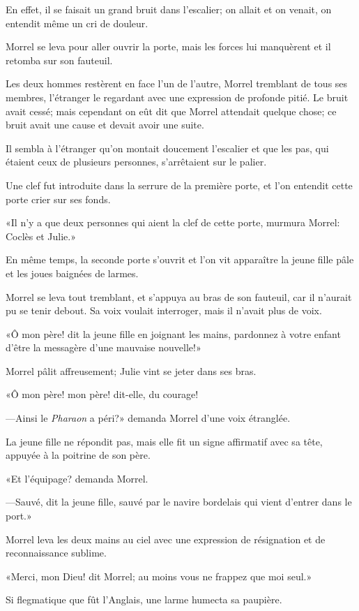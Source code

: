 En effet, il se faisait un grand bruit dans l'escalier; on allait et on venait, on entendit même un cri de douleur.

Morrel se leva pour aller ouvrir la porte, mais les forces lui manquèrent et il retomba sur son fauteuil.

Les deux hommes restèrent en face l'un de l'autre, Morrel tremblant de tous ses membres, l'étranger le regardant avec une expression de profonde pitié. Le bruit avait cessé; mais cependant on eût dit que Morrel attendait quelque chose; ce bruit avait une cause et devait avoir une suite.

Il sembla à l'étranger qu'on montait doucement l'escalier et que les pas, qui étaient ceux de plusieurs personnes, s'arrêtaient sur le palier.

Une clef fut introduite dans la serrure de la première porte, et l'on entendit cette porte crier sur ses fonds.

«Il n'y a que deux personnes qui aient la clef de cette porte, murmura Morrel: Coclès et Julie.»

En même temps, la seconde porte s'ouvrit et l'on vit apparaître la jeune fille pâle et les joues baignées de larmes.

Morrel se leva tout tremblant, et s'appuya au bras de son fauteuil, car il n'aurait pu se tenir debout. Sa voix voulait interroger, mais il n'avait plus de voix.

«Ô mon père! dit la jeune fille en joignant les mains, pardonnez à votre enfant d'être la messagère d'une mauvaise nouvelle!»

Morrel pâlit affreusement; Julie vint se jeter dans ses bras.

«Ô mon père! mon père! dit-elle, du courage!

—Ainsi le \textit{Pharaon} a péri?» demanda Morrel d'une voix étranglée.

La jeune fille ne répondit pas, mais elle fit un signe affirmatif avec sa tête, appuyée à la poitrine de son père.

«Et l'équipage? demanda Morrel.

—Sauvé, dit la jeune fille, sauvé par le navire bordelais qui vient d'entrer dans le port.»

Morrel leva les deux mains au ciel avec une expression de résignation et de reconnaissance sublime.

«Merci, mon Dieu! dit Morrel; au moins vous ne frappez que moi seul.»

Si flegmatique que fût l'Anglais, une larme humecta sa paupière.

